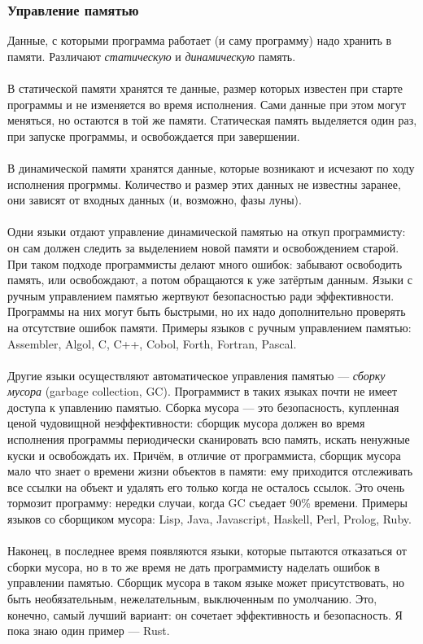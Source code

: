 \documentclass[11pt]{book}
\begin{document}
\subsubsection{Управление памятью}
Данные, с которыми программа работает (и саму программу) надо хранить в памяти.
Различают \emph{статическую} и \emph{динамическую} память.
\\ \\
В статической памяти хранятся те данные, размер которых известен при старте программы и не изменяется во время исполнения.
Сами данные при этом могут меняться, но остаются в той же памяти.
Статическая память выделяется один раз, при запуске программы, и освобождается при завершении.
\\ \\
В динамической памяти хранятся данные, которые возникают и исчезают по ходу исполнения прогрммы.
Количество и размер этих данных не известны заранее, они зависят от входных данных (и, возможно, фазы луны).
\\ \\
Одни языки отдают управление динамической памятью на откуп программисту: он сам должен следить за выделением новой памяти и освобождением старой.
При таком подходе программисты делают много ошибок: забывают освободить память,
или освобождают, а потом обращаются к уже затёртым данным.
Языки с ручным управлением памятью жертвуют безопасностью ради эффективности.
Программы на них могут быть быстрыми, но их надо дополнительно проверять на отсутствие ошибок памяти.
Примеры языков с ручным управлением памятью: Assembler, Algol, C, C++, Cobol, Forth, Fortran, Pascal.
\\ \\
Другие языки осуществляют автоматическое управления памятью --- \emph{сборку мусора} (garbage collection, GC).
Программист в таких языках почти не имеет доступа к упавлению памятью.
Сборка мусора --- это безопасность, купленная ценой чудовищной неэффективности:
сборщик мусора должен во время исполнения программы периодически сканировать всю память, искать ненужные куски и освобождать их.
Причём, в отличие от программиста, сборщик мусора мало что знает о времени жизни объектов в памяти:
ему приходится отслеживать все ссылки на объект и удалять его только когда не осталось ссылок.
Это очень тормозит программу: нередки случаи, когда GC съедает 90\% времени.
Примеры языков со сборщиком мусора: Lisp, Java, Javascript, Haskell, Perl, Prolog, Ruby.
\\ \\
Наконец, в последнее время появляются языки, которые пытаются отказаться от сборки мусора,
но в то же время не дать программисту наделать ошибок в управлении памятью.
Сборщик мусора в таком языке может присутствовать, но быть необязательным, нежелательным, выключенным по умолчанию.
Это, конечно, самый лучший вариант: он сочетает эффективность и безопасность.
Я пока знаю один пример --- Rust.
\end{document}
